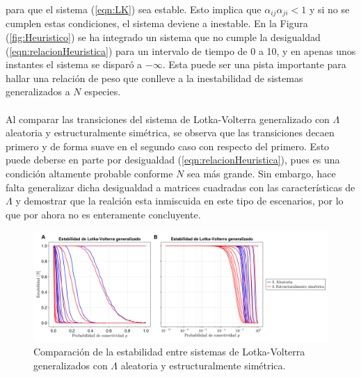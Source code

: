 para que el sistema (\ref{eqn:LK}) sea estable. Esto implica que $\alpha_{ij}\alpha_{ji}<1$ y si no se cumplen estas condiciones, el sistema deviene a inestable. En la Figura (\ref{fig:Heuristico}) se ha integrado un sistema que no cumple la desigualdad (\ref{eqn:relacionHeuristica}) para un intervalo de tiempo de 0 a 10, y en apenas unos instantes el sistema se disparó a $-\infty$. Esta puede ser una pista importante para hallar una relación de peso que conlleve a la inestabilidad de sistemas generalizados a $N$ especies. 
\\
\\
Al comparar las transiciones del sistema de Lotka-Volterra generalizado con $\Lambda$ aleatoria y estructuralmente simétrica, se observa que las transiciones decaen primero y de forma suave en el segundo caso con respecto del primero. Esto puede deberse en parte por desigualdad (\ref{eqn:relacionHeuristica}), pues es una condición altamente probable conforme $N$ sea más grande. Sin embargo, hace falta generalizar dicha desigualdad a matrices cuadradas con las características de $\Lambda$ y demostrar que la realción esta inmiscuida en este tipo de escenarios, por lo que por ahora no es enteramente concluyente.
\begin{figure}[h!]
	\centering
	\includegraphics[scale=0.16]{../Imagenes/ComparacionIncidenciasp}
	\caption{Comparación de la estabilidad entre sistemas de Lotka-Volterra generalizados con $\Lambda$ aleatoria y estructuralmente simétrica.}
	\label{fig:ComparacionIncidenciasp}
\end{figure}

